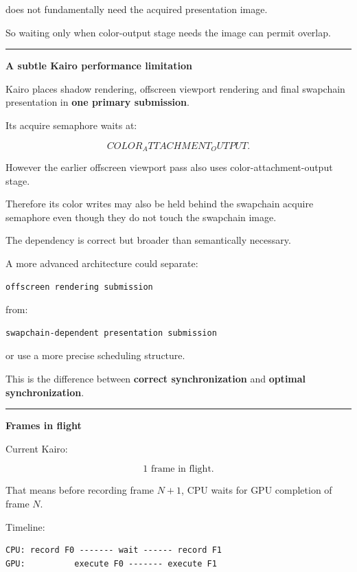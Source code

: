 does not fundamentally need the acquired presentation image.

So waiting only when color-output stage needs the image can permit overlap.

\begin{center}\rule{0.5\linewidth}{0.5pt}\end{center}

\textbf{A subtle Kairo performance limitation}

Kairo places shadow rendering, offscreen viewport rendering and final swapchain presentation in \textbf{one primary submission}.

Its acquire semaphore waits at:

\[
COLOR_ATTACHMENT_OUTPUT.
\]

However the earlier offscreen viewport pass also uses color-attachment-output stage.

Therefore its color writes may also be held behind the swapchain acquire semaphore even though they do not touch the swapchain image.

The dependency is correct but broader than semantically necessary.

A more advanced architecture could separate:

\begin{verbatim}
offscreen rendering submission
\end{verbatim}

from:

\begin{verbatim}
swapchain-dependent presentation submission
\end{verbatim}

or use a more precise scheduling structure.

This is the difference between \textbf{correct synchronization} and \textbf{optimal synchronization}.

\begin{center}\rule{0.5\linewidth}{0.5pt}\end{center}

\textbf{Frames in flight}

Current Kairo:

\[
\boxed{1\text{ frame in flight}.}
\]

That means before recording frame \(N+1\), CPU waits for GPU completion of frame \(N\).

Timeline:

\begin{verbatim}
CPU: record F0 ------- wait ------ record F1
GPU:          execute F0 ------- execute F1
\end{verbatim}

